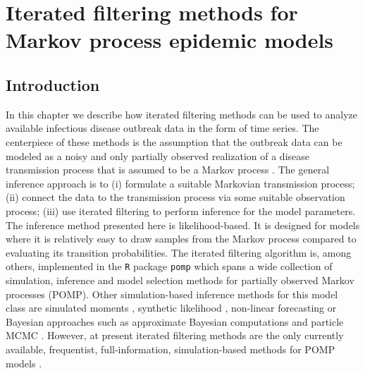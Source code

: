 
\setcounter{chapter}{0}

\chapter[Iterated filtering methods for POMP]{Iterated filtering methods for Markov process epidemic models}

\section{Introduction}
In this chapter we describe how iterated filtering methods \citep{ionides06, Ionides2015}
can be used to analyze available infectious disease outbreak data in the form of time series.
The centerpiece of these methods is the assumption that the outbreak data can be modeled as a  noisy and only partially observed realization of a disease transmission process that is assumed to be a Markov process \citep{kingNgu}.
The general inference approach is to (i) formulate a suitable Markovian transmission process; (ii) connect the data to the transmission process via some suitable observation process; (iii) use iterated filtering to perform inference for the model parameters.  
The inference  method presented here is likelihood-based. It is designed for models where it is relatively easy to draw samples from the Markov process compared to evaluating its transition probabilities. The iterated filtering algorithm is, among others, implemented in the \texttt{R} package \texttt{pomp} \citep{kingNgu} which spans a wide collection of simulation, inference and model selection methods for partially observed Markov processes (POMP). Other simulation-based   inference methods for this model class are  simulated moments \citep{sm}, synthetic likelihood \citep{sl}, non-linear forecasting  \citep{nlf} or  Bayesian approaches such as  approximate Bayesian computations \citep{abc, liu}  and  particle MCMC \citep{pmcmc}. However, at present  iterated filtering methods are the only currently available, frequentist, full-information, simulation-based methods for POMP models \citep{Ionides2015}.\\
